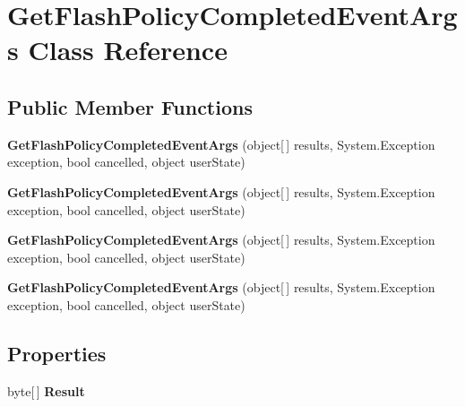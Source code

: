 \hypertarget{class_get_flash_policy_completed_event_args}{
\section{GetFlashPolicyCompletedEventArgs Class Reference}
\label{class_get_flash_policy_completed_event_args}
}
\subsection*{Public Member Functions}
\begin{DoxyCompactItemize}
\item 
\hypertarget{class_get_flash_policy_completed_event_args_a5ee5dec7cf6b256ae87a031d755ed81d}{
{\bfseries GetFlashPolicyCompletedEventArgs} (object\mbox{[}$\,$\mbox{]} results, System.Exception exception, bool cancelled, object userState)}
\label{class_get_flash_policy_completed_event_args_a5ee5dec7cf6b256ae87a031d755ed81d}

\item 
\hypertarget{class_get_flash_policy_completed_event_args_a5ee5dec7cf6b256ae87a031d755ed81d}{
{\bfseries GetFlashPolicyCompletedEventArgs} (object\mbox{[}$\,$\mbox{]} results, System.Exception exception, bool cancelled, object userState)}
\label{class_get_flash_policy_completed_event_args_a5ee5dec7cf6b256ae87a031d755ed81d}

\item 
\hypertarget{class_get_flash_policy_completed_event_args_a5ee5dec7cf6b256ae87a031d755ed81d}{
{\bfseries GetFlashPolicyCompletedEventArgs} (object\mbox{[}$\,$\mbox{]} results, System.Exception exception, bool cancelled, object userState)}
\label{class_get_flash_policy_completed_event_args_a5ee5dec7cf6b256ae87a031d755ed81d}

\item 
\hypertarget{class_get_flash_policy_completed_event_args_a5ee5dec7cf6b256ae87a031d755ed81d}{
{\bfseries GetFlashPolicyCompletedEventArgs} (object\mbox{[}$\,$\mbox{]} results, System.Exception exception, bool cancelled, object userState)}
\label{class_get_flash_policy_completed_event_args_a5ee5dec7cf6b256ae87a031d755ed81d}

\end{DoxyCompactItemize}
\subsection*{Properties}
\begin{DoxyCompactItemize}
\item 
\hypertarget{class_get_flash_policy_completed_event_args_a46b11069fc5821b663b92a979729b1e7}{
byte\mbox{[}$\,$\mbox{]} {\bfseries Result}}
\label{class_get_flash_policy_completed_event_args_a46b11069fc5821b663b92a979729b1e7}

\end{DoxyCompactItemize}


